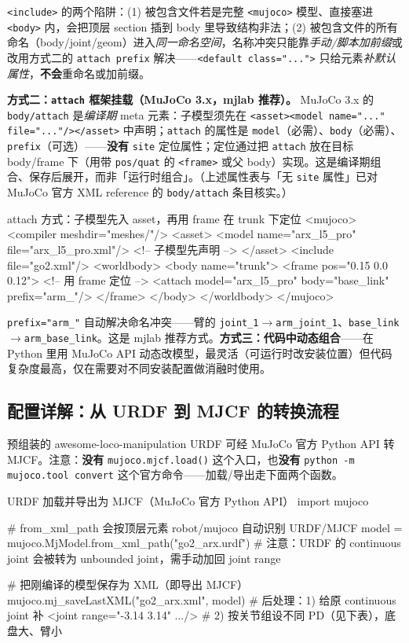 \verb|<include>| 的两个陷阱：(1) 被包含文件若是完整 \verb|<mujoco>| 模型、直接塞进 \verb|<body>| 内，会把顶层 section 插到 body 里导致结构非法；(2) 被包含文件的所有命名（body/joint/geom）进入\emph{同一命名空间}，名称冲突只能靠\emph{手动/脚本加前缀}或改用方式二的 \verb|attach prefix| 解决——\verb|<default class="...">| 只给元素\emph{补默认属性}，\textbf{不会}重命名或加前缀。

\textbf{方式二：\texttt{attach} 框架挂载（MuJoCo 3.x，mjlab 推荐）。} MuJoCo 3.x 的 \verb|body/attach| 是\emph{编译期} meta 元素：子模型须先在 \verb|<asset><model name="..." file="..."/></asset>| 中声明；\verb|attach| 的属性是 \verb|model|（必需）、\verb|body|（必需）、\verb|prefix|（可选）——\textbf{没有} \verb|site| 定位属性；定位通过把 \verb|attach| 放在目标 body/frame 下（用带 \verb|pos/quat| 的 \verb|<frame>| 或父 body）实现。这是编译期组合、保存后展开，而非「运行时组合」。（上述属性表与「无 \texttt{site} 属性」已对 MuJoCo 官方 XML reference 的 \texttt{body/attach} 条目核实。）

\begin{codebox}[text]{attach 方式：子模型先入 asset，再用 frame 在 trunk 下定位}
<mujoco>
  <compiler meshdir="meshes/"/>
  <asset>
    <model name="arx_l5_pro" file="arx_l5_pro.xml"/>   <!-- 子模型先声明 -->
  </asset>
  <include file="go2.xml"/>
  <worldbody>
    <body name="trunk">
      <frame pos="0.15 0.0 0.12">                       <!-- 用 frame 定位 -->
        <attach model="arx_l5_pro" body="base_link" prefix="arm_"/>
      </frame>
    </body>
  </worldbody>
</mujoco>
\end{codebox}

\verb|prefix="arm_"| 自动解决命名冲突——臂的 \verb|joint_1|$\to$\verb|arm_joint_1|、\verb|base_link|$\to$\verb|arm_base_link|。这是 mjlab 推荐方式。\textbf{方式三：代码中动态组合}——在 Python 里用 MuJoCo API 动态改模型，最灵活（可运行时改安装位置）但代码复杂度最高，仅在需要对不同安装配置做消融时使用。

\subsection{配置详解：从 URDF 到 MJCF 的转换流程}
\label{sec:rlmc-lm-urdf2mjcf}

预组装的 awesome-loco-manipulation URDF 可经 MuJoCo 官方 Python API 转 MJCF。注意：\textbf{没有} \verb|mujoco.mjcf.load()| 这个入口，也\textbf{没有} \verb|python -m mujoco.tool convert| 这个官方命令——加载/导出走下面两个函数。

\begin{codebox}[Python]{URDF 加载并导出为 MJCF（MuJoCo 官方 Python API）}
import mujoco

# from_xml_path 会按顶层元素 robot/mujoco 自动识别 URDF/MJCF
model = mujoco.MjModel.from_xml_path("go2_arx.urdf")
# 注意：URDF 的 continuous joint 会被转为 unbounded joint，需手动加回 joint range

# 把刚编译的模型保存为 XML（即导出 MJCF）
mujoco.mj_saveLastXML("go2_arx.xml", model)
# 后处理：1) 给原 continuous joint 补 <joint range="-3.14 3.14" .../>
#         2) 按关节组设不同 PD（见下表），底盘大、臂小
\end{codebox}

